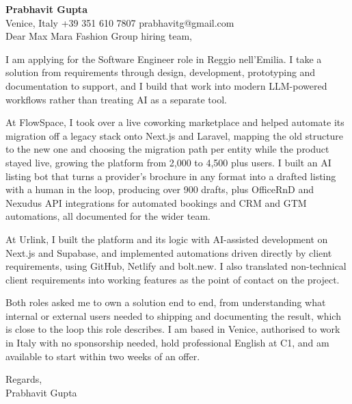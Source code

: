 \documentclass[a4paper,10.5pt]{article}
\begin{document}
\textbf{Prabhavit Gupta}\\
Venice, Italy \textbar{} +39 351 610 7807 \textbar{} prabhavitg@gmail.com\\[10pt]
Dear Max Mara Fashion Group hiring team,

I am applying for the Software Engineer role in Reggio nell'Emilia. I take a solution from requirements through design, development, prototyping and documentation to support, and I build that work into modern LLM-powered workflows rather than treating AI as a separate tool.

At FlowSpace, I took over a live coworking marketplace and helped automate its migration off a legacy stack onto Next.js and Laravel, mapping the old structure to the new one and choosing the migration path per entity while the product stayed live, growing the platform from 2,000 to 4,500 plus users. I built an AI listing bot that turns a provider's brochure in any format into a drafted listing with a human in the loop, producing over 900 drafts, plus OfficeRnD and Nexudus API integrations for automated bookings and CRM and GTM automations, all documented for the wider team.

At Urlink, I built the platform and its logic with AI-assisted development on Next.js and Supabase, and implemented automations driven directly by client requirements, using GitHub, Netlify and bolt.new. I also translated non-technical client requirements into working features as the point of contact on the project.

Both roles asked me to own a solution end to end, from understanding what internal or external users needed to shipping and documenting the result, which is close to the loop this role describes. I am based in Venice, authorised to work in Italy with no sponsorship needed, hold professional English at C1, and am available to start within two weeks of an offer.

Regards,\\
Prabhavit Gupta
\end{document}
